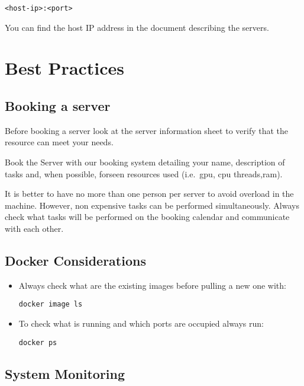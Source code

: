 \documentclass[
]{book}
\begin{document}
\begin{verbatim}
<host-ip>:<port>
\end{verbatim}

You can find the host IP address in the document describing the servers.

\hypertarget{best-practices}{%
\chapter{Best Practices}\label{best-practices}}

\hypertarget{booking-a-server}{%
\section{Booking a server}\label{booking-a-server}}

Before booking a server look at the server information sheet to verify that the resource can meet your needs.

Book the Server with our booking system detailing your name, description of tasks and, when possible, forseen resources used (i.e.~gpu, cpu threads,ram).

It is better to have no more than one person per server to avoid overload in the machine. However, non expensive tasks can be performed simultaneously. Always check what tasks will be performed on the booking calendar and communicate with each other.

\hypertarget{docker-considerations}{%
\section{Docker Considerations}\label{docker-considerations}}

\begin{itemize}
\item
  Always check what are the existing images before pulling a new one with:

\begin{verbatim}
docker image ls
\end{verbatim}
\item
  To check what is running and which ports are occupied always run:

\begin{verbatim}
docker ps 
\end{verbatim}
\end{itemize}

\hypertarget{system-monitoring}{%
\section{System Monitoring}\label{system-monitoring}}
\end{document}
